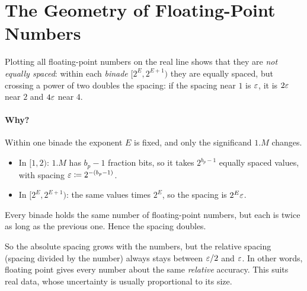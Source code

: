 \section{The Geometry of Floating-Point Numbers}
\label{sec:fp-geometry}

Plotting all floating-point numbers on the real line shows that they are \emph{not equally spaced}: within each \emph{binade} $[2^E, 2^{E+1})$ they are equally spaced, but crossing a power of two doubles the spacing: if the spacing near $1$ is $\varepsilon$, it is $2\varepsilon$ near $2$ and $4\varepsilon$ near $4$.
\begin{center}
\end{center}

\paragraph{Why?} Within one binade the exponent $E$ is fixed, and only the significand $1.M$ changes.
\begin{itemize}
  \item In $[1, 2)$: $1.M$ has $b_p - 1$ fraction bits, so it takes $2^{b_p - 1}$ equally spaced values, with spacing $\varepsilon \coloneqq 2^{-(b_p - 1)}$.
  \item In $[2^E, 2^{E+1})$: the same values times $2^E$, so the spacing is $2^E\varepsilon$.
\end{itemize}
Every binade holds the same number of floating-point numbers, but each is twice as long as the previous one. Hence the spacing doubles.


So the absolute spacing grows with the numbers, but the relative spacing (spacing divided by the number) always stays between $\varepsilon/2$ and $\varepsilon$. In other words, floating point gives every number about the same \emph{relative} accuracy. This suits real data, whose uncertainty is usually proportional to its size.

